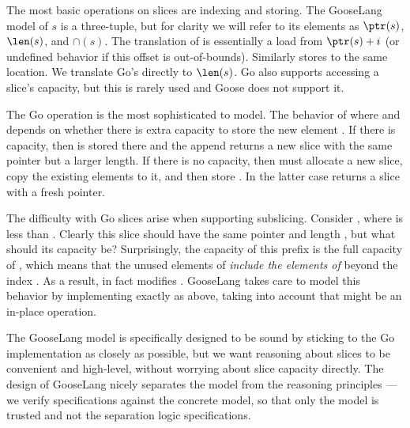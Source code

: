 
The most basic operations on slices are indexing and storing. The
GooseLang model of $s$ is a three-tuple, but for clarity we will refer
to its elements as $\ptr(s)$, $\len(s)$, and $\cap(s)$. The
translation of  is essentially a load from
$\ptr(s) + i$ (or undefined behavior if this offset is out-of-bounds).
Similarly  stores to the same location. We
translate Go's  directly to $\len(s)$. Go also supports
accessing a slice's capacity, but this is rarely used and Goose does not
support it.

The Go  operation is the most sophisticated to model. The
behavior of  where  and
 depends on whether there is extra capacity to store the
new element . If there is capacity, then  is stored
there and the append returns a new slice with the same pointer but a
larger length. If there is no capacity, then  must
allocate a new slice, copy the existing elements to it, and then store
. In the latter case  returns a slice with a
fresh pointer.

The difficulty with Go slices arise when supporting subslicing. Consider
, where  is less than .
Clearly this slice should have the same pointer and length ,
but what should its capacity be? Surprisingly, the capacity of this
prefix is the full capacity of , which means that the unused
elements of  \emph{include the elements of }
beyond the index . As a result, 
in fact modifies . GooseLang takes care to model this
behavior by implementing  exactly as above, taking into
account that  might be an in-place operation.

The GooseLang model is specifically designed to be sound by sticking to
the Go implementation as closely as possible, but we want reasoning
about slices to be convenient and high-level, without worrying about
slice capacity directly. The design of GooseLang nicely separates the
model from the reasoning principles --- we verify specifications against
the concrete model, so that only the model is trusted and not the
separation logic specifications.

\newcommand{\sliceRep}{\mathtt{sliceRep}}
\newcommand{\sliceCap}{\mathtt{sliceCap}}

\newcommand{\lappend}{\mdoubleplus}

